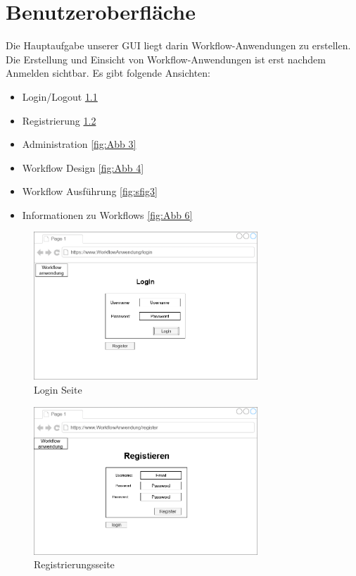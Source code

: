 \chapter{Benutzeroberfläche}
    Die Hauptaufgabe unserer \gls{GUI} liegt darin Workflow-Anwendungen zu erstellen. Die Erstellung und Einsicht von Workflow-Anwendungen ist erst nachdem Anmelden sichtbar. Es gibt folgende Ansichten:
    \begin{itemize}
        \item Login/Logout \ref{fig:Abb 1}
        \item Registrierung \ref{fig:Abb 2}
        \item Administration \ref{fig:Abb 3}
        \item Workflow Design \ref{fig:Abb 4}
        \item Workflow Ausführung \ref{fig:sfig3}
        \item Informationen zu Workflows \ref{fig:Abb 6}
    \end{itemize}

\begin{figure}[ht]
    \centering
    \includegraphics[width = 0.75\textwidth]{Grafiken/Gui Mockups/loginGui.drawio.png}
    \caption{Login Seite}
    \label{fig:Abb 1}
\end{figure}

\begin{figure}[ht]
    \centering
    \includegraphics[width = 0.75\textwidth]{Grafiken/Gui Mockups/registrationGui.drawio.png}
    \caption{Registrierungsseite}
    \label{fig:Abb 2}
\end{figure}


